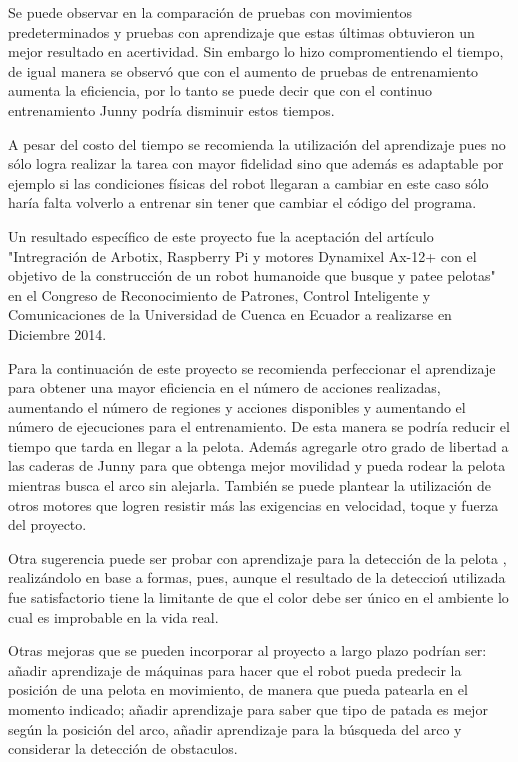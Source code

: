 Se puede observar en la comparaci\'on de pruebas con movimientos predeterminados y pruebas con aprendizaje que estas \'ultimas obtuvieron un mejor resultado en acertividad. Sin embargo  lo hizo compromentiendo el tiempo, de igual manera se observ\'o que con el aumento de pruebas de entrenamiento aumenta la eficiencia, por lo tanto se puede decir que con el continuo entrenamiento Junny podr\'ia disminuir estos tiempos. 

A pesar del costo del tiempo se recomienda la utilizaci\'on del aprendizaje pues no s\'olo logra realizar la tarea con mayor fidelidad sino que adem\'as es adaptable por ejemplo si las condiciones f\'isicas del robot llegaran a cambiar en este caso s\'olo haría falta volverlo a entrenar sin tener que cambiar el código del programa.

Un resultado espec\'ifico de este proyecto fue la aceptaci\'on del art\'iculo "Intregraci\'on de Arbotix, Raspberry Pi y motores Dynamixel Ax-12+ con el objetivo de la construcción de un robot humanoide que busque  y patee pelotas" \cite{junny} en el Congreso de Reconocimiento de Patrones, Control Inteligente y Comunicaciones de la Universidad de Cuenca en Ecuador a realizarse en Diciembre 2014.

Para la continuaci\'on de este proyecto se recomienda perfeccionar el aprendizaje para obtener una mayor eficiencia en el n\'umero de acciones realizadas, aumentando el número de regiones y acciones disponibles y aumentando el número de ejecuciones para el entrenamiento. De esta manera se podría reducir el tiempo que tarda en llegar a la pelota. Además agregarle otro grado de libertad a las 
caderas de Junny para que obtenga mejor movilidad y pueda rodear la pelota mientras busca el arco sin alejarla. Tambi\'en se puede plantear la utilizaci\'on de otros motores que logren resistir m\'as las exigencias en velocidad, toque y fuerza del proyecto.

Otra sugerencia puede ser probar con aprendizaje para la detecci\'on de la pelota , realiz\'andolo en base a formas, pues, aunque el resultado de la deteccio\'n utilizada fue satisfactorio tiene la limitante de que el color debe ser \'unico en el ambiente lo cual es improbable en la vida real.  

Otras mejoras que se pueden incorporar al proyecto a largo plazo podrían ser: añadir aprendizaje de m\'aquinas para hacer que el robot pueda predecir la posición de una pelota en movimiento, de manera que pueda patearla en el momento indicado; a\~nadir aprendizaje para saber que tipo de patada es mejor seg\'un la posición del arco, a\~nadir aprendizaje para la búsqueda del arco y considerar la detecci\'on de obstaculos.

